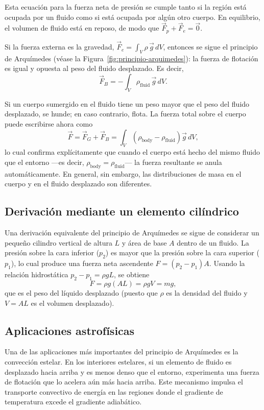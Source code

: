 Esta ecuación para la fuerza neta de presión se cumple tanto si la región está ocupada por un fluido como si está ocupada por algún otro cuerpo. En equilibrio, el volumen de fluido está en reposo, de modo que $\vec{F}_p + \vec{F}_e = \vec{0}$.

Si la fuerza externa es la gravedad, $\vec{F}_e = \int_V \rho\,\vec{g}\,dV$, entonces se sigue el principio de Arquímedes (véase la Figura~\ref{fig:principio-arquimedes}): la fuerza de flotación es igual y opuesta al peso del fluido desplazado. Es decir,
$$ \vec{F}_B = -\int_V \rho_{\mathrm{fluid}}\,\vec{g}\,dV. $$

Si un cuerpo sumergido en el fluido tiene un peso mayor que el peso del fluido desplazado, se hunde; en caso contrario, flota. La fuerza total sobre el cuerpo puede escribirse ahora como
$$ \vec{F} = \vec{F}_G + \vec{F}_B = \int_V \left(\rho_{\mathrm{body}} - \rho_{\mathrm{fluid}}\right)\vec{g}\,dV, $$
lo cual confirma explícitamente que cuando el cuerpo está hecho del mismo fluido que el entorno —es decir, $\rho_{\mathrm{body}} = \rho_{\mathrm{fluid}}$— la fuerza resultante se anula automáticamente. En general, sin embargo, las distribuciones de masa en el cuerpo y en el fluido desplazado son diferentes.

\figuraPrincipioArquimedes

\subsection{Derivación mediante un elemento cilíndrico}

Una derivación equivalente del principio de Arquímedes se sigue de considerar un pequeño cilindro vertical de altura $L$ y área de base $A$ dentro de un fluido. La presión sobre la cara inferior ($p_2$) es mayor que la presión sobre la cara superior ($p_1$), lo cual produce una fuerza neta ascendente $F = (p_2 - p_1)A$. Usando la relación hidrostática $p_2 - p_1 = \rho g L$, se obtiene
$$ F = \rho g(AL) = \rho g V = mg, $$
que es el peso del líquido desplazado (puesto que $\rho$ es la densidad del fluido y $V = AL$ es el volumen desplazado).

\figuraCilindroArquimedes

\subsection{Aplicaciones astrofísicas}

Una de las aplicaciones más importantes del principio de Arquímedes es la convección estelar. En los interiores estelares, si un elemento de fluido es desplazado hacia arriba y es menos denso que el entorno, experimenta una fuerza de flotación que lo acelera aún más hacia arriba. Este mecanismo impulsa el transporte convectivo de energía en las regiones donde el gradiente de temperatura excede el gradiente adiabático.

